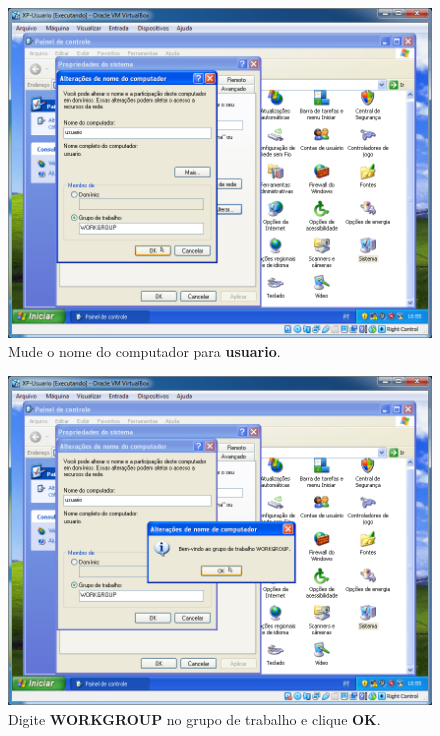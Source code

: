 \documentclass[10pt]{article}
\begin{document}
\begin{figure}[H]
    \centering
    \caption{Mude o nome do computador para \textbf{usuario}.}
    \label{fig:4123}
    \includegraphics[width=\linewidth]{images/xp_rede/007.png}
\end{figure}

\begin{figure}[H]
    \centering
    \caption{Digite \textbf{WORKGROUP} no grupo de trabalho e clique \textbf{OK}.}
    \label{fig:4124}
    \includegraphics[width=\linewidth]{images/xp_rede/008.png}
\end{figure}
\end{document}

